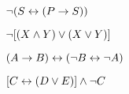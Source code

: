 \begin{compactlist}

\item $\neg (S \leftrightarrow (P \rightarrow S))$



 \item $\neg [(X \wedge Y) \vee (X \vee Y)]$



\item $(A \rightarrow B) \leftrightarrow (\neg B\leftrightarrow \neg A)$

\item $[C \leftrightarrow (D \vee E)] \wedge \neg C$



\end{compactlist}
